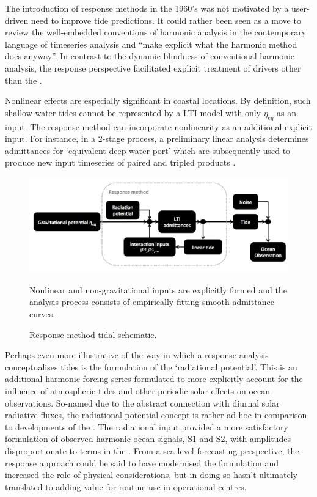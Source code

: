The introduction of response methods in the 1960's was not motivated by a user-driven need to improve tide predictions.  It could rather been seen as a move to review the well-embedded conventions of harmonic analysis in the contemporary language of timeseries analysis and ``make explicit what the harmonic method does anyway''\citep[pp 540]{Munk:1966ts}.  In contrast to the dynamic blindness of conventional harmonic analysis, the response perspective facilitated explicit treatment of drivers other than the \ATGP{}.

Nonlinear effects are especially significant in coastal locations.   By definition, such shallow-water tides cannot be represented by a LTI model with only $\eta_{eq}$ as an input.  The response method can incorporate nonlinearity as an additional explicit input.    For instance,  in a 2-stage process, a preliminary linear analysis determines admittances for `equivalent deep water port' which are subsequently used to produce new input timeseries of paired and tripled products \citep[pp 122]{Pugh:1996uz}.
\begin{figure}[!hbt] \centering
    \includegraphics[width=\figwidthBig]{figures/diagrams/response_analysis_flowchart.png}
    \caption{Response method tidal schematic.}
    {Nonlinear and non-gravitational inputs are explicitly formed and the analysis process consists of empirically fitting smooth admittance curves.}
\label{fig:response}
\end{figure}
Perhaps even more illustrative of the way in which a response analysis conceptualises tides is the formulation of the `radiational potential'.   This is an additional harmonic forcing series formulated to more explicitly account for the influence of atmospheric tides and other periodic solar effects on ocean observations. So-named due to the abstract connection with diurnal solar radiative fluxes, the radiational potential concept is rather ad hoc in comparison to developments of the \ATGP{}.  
The radiational input provided a more satisfactory formulation of observed harmonic ocean signals, S1 and S2, with amplitudes disproportionate to terms in the \ATGP{}.
From a sea level forecasting perspective, the response approach could be said to have modernised the formulation and increased the role of physical considerations, but in doing so hasn't ultimately translated to adding value for routine use in operational centres.


